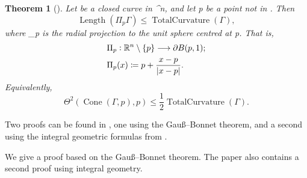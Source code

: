 \documentclass[a4paper, 11pt]{article}
\theoremstyle{plain}
\newtheorem{theorem}{Theorem}[section]
\theoremstyle{definition}
\theoremstyle{remark}
\numberwithin{equation}{subsection}
\def\({}
\def\){}
\def\pi{}
\begin{document}
\begin{theorem}[{\cite[Theorem 1.1]{EWW02}}]
\label{Interior_Regularity_2}
Let \(\Gamma\) be a closed curve in \(^{n}\), and let \(p\) be a point not in \(\Gamma\). Then
\begin{equation}
\operatorname{Length}(\Pi_{p}\Gamma) \leqslant \operatorname{TotalCurvature}(\Gamma),
\end{equation}
where \(\Pi_{p}\) is the radial projection to the unit sphere centred at \(p\). That is,
\begin{align*}
&\Pi_{p} \vcentcolon \mathbb{R}^{n} \setminus \{p\} \longrightarrow \partial B(p,1); \\
&\Pi_{p}(x) \coloneq p + \frac{x-p}{|x-p|}.
\end{align*}
Equivalently,
\begin{equation}
\Theta^{2}(\operatorname{Cone}(\Gamma, p), p) \leqslant \frac{1}{2\pi}\operatorname{TotalCurvature}(\Gamma).
\end{equation}
\end{theorem}

Two proofs can be found in \cite{EWW02}, one using the Gau\ss--Bonnet theorem, and a second using the integral geometric formulas from \cite{Mil50}.


We give a proof based on the Gau\ss --Bonnet theorem. The paper also contains a second proof using integral geometry.
\end{document}
